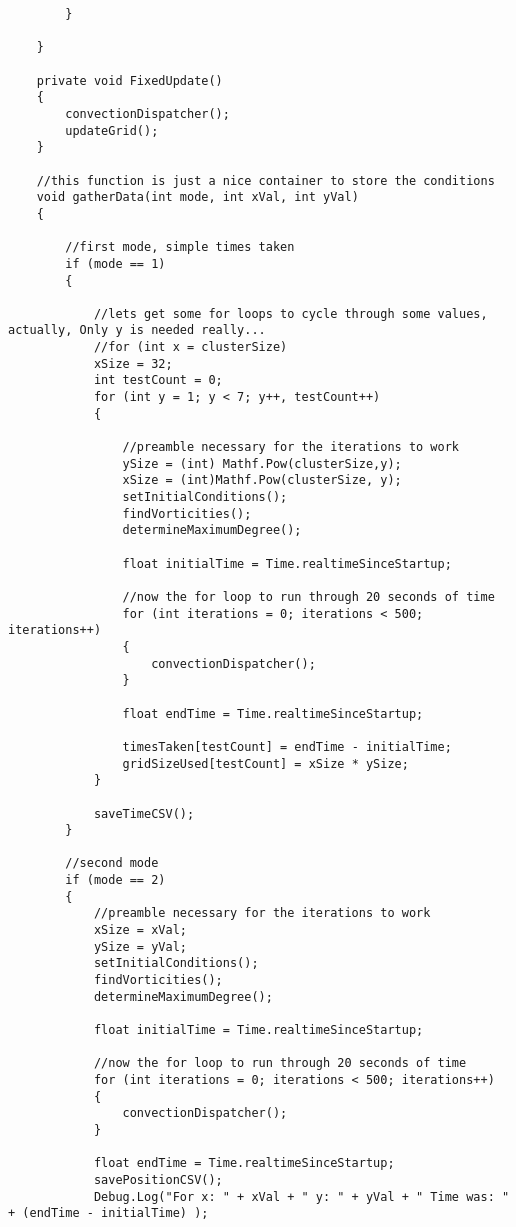\begin{mdframed}[linecolor=black, topline=true, bottomline=true,
  leftline=false, rightline=false]
\begin{verbatim}
        }
		
	}

    private void FixedUpdate()
    {
        convectionDispatcher();
        updateGrid();
    }

    //this function is just a nice container to store the conditions 
    void gatherData(int mode, int xVal, int yVal)
    {

        //first mode, simple times taken
        if (mode == 1)
        {

            //lets get some for loops to cycle through some values, actually, Only y is needed really...
            //for (int x = clusterSize)
            xSize = 32;
            int testCount = 0;
            for (int y = 1; y < 7; y++, testCount++)
            {

                //preamble necessary for the iterations to work
                ySize = (int) Mathf.Pow(clusterSize,y);
                xSize = (int)Mathf.Pow(clusterSize, y);
                setInitialConditions();
                findVorticities();
                determineMaximumDegree();

                float initialTime = Time.realtimeSinceStartup;

                //now the for loop to run through 20 seconds of time
                for (int iterations = 0; iterations < 500; iterations++)
                {
                    convectionDispatcher();
                }

                float endTime = Time.realtimeSinceStartup;

                timesTaken[testCount] = endTime - initialTime;
                gridSizeUsed[testCount] = xSize * ySize;
            }

            saveTimeCSV();
        }
        
        //second mode
        if (mode == 2)
        {
            //preamble necessary for the iterations to work
            xSize = xVal;
            ySize = yVal;
            setInitialConditions();
            findVorticities();
            determineMaximumDegree();

            float initialTime = Time.realtimeSinceStartup;

            //now the for loop to run through 20 seconds of time
            for (int iterations = 0; iterations < 500; iterations++)
            {
                convectionDispatcher();
            }

            float endTime = Time.realtimeSinceStartup;
            savePositionCSV();
            Debug.Log("For x: " + xVal + " y: " + yVal + " Time was: " + (endTime - initialTime) );


\end{verbatim}
\end{mdframed}
